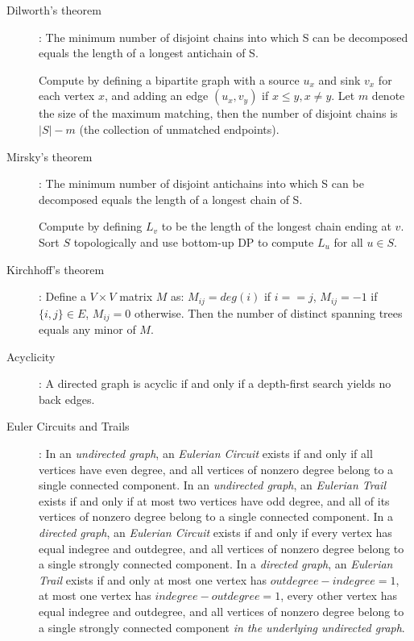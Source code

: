 \documentclass[
	a4paper,
	landscape,
	twoside,
	10pt,
	article
]{article}
\begin{document}
\begin{description}
	\item[Dilworth's theorem]:
		The minimum number of disjoint chains into which S can be decomposed equals the length of a longest antichain of S.

		Compute by defining a bipartite graph with a source $u_x$ and sink $v_x$ for each vertex $x$, and adding an edge $(u_x, v_y)$ if $x \leq y, x \neq y$. Let $m$ denote the size of the maximum matching, then the number of disjoint chains is $|S| - m$ (the collection of unmatched endpoints).

	\item[Mirsky's theorem]:
		The minimum number of disjoint antichains into which S can be decomposed equals the length of a longest chain of S.

		Compute by defining $L_v$ to be the length of the longest chain ending at $v$. Sort $S$ topologically and use bottom-up DP to compute $L_u$ for all $u \in S$.

	\item[Kirchhoff's theorem]:
		Define a $V \times V$ matrix $M$ as: $M_{ij} = deg(i)$ if $i == j$, $M_{ij} = - 1$ if $\{i, j\} \in E$, $M_{ij} = 0$ otherwise. Then the number of distinct spanning trees equals any minor of $M$.

	\item[Acyclicity]:
		A directed graph is acyclic if and only if a depth-first search yields no back edges.

	\item[Euler Circuits and Trails]:
		In an \textit{undirected graph}, an \textit{Eulerian Circuit} exists if and only if all vertices have even degree, and all vertices of nonzero degree belong to a single connected component. In an \textit{undirected graph}, an \textit{Eulerian Trail} exists if and only if at most two vertices have odd degree, and all of its vertices of nonzero degree belong to a single connected component. In a \textit{directed graph}, an \textit{Eulerian Circuit} exists if and only if every vertex has equal indegree and outdegree, and all vertices of nonzero degree belong to a single strongly connected component. In a \textit{directed graph}, an \textit{Eulerian Trail} exists if and only at most one vertex has $outdegree - indegree = 1$, at most one vertex has $indegree - outdegree = 1$, every other vertex has equal indegree and outdegree, and all vertices of nonzero degree belong to a single strongly connected component \textit{in the underlying undirected graph}.
\end{description}
\end{document}
